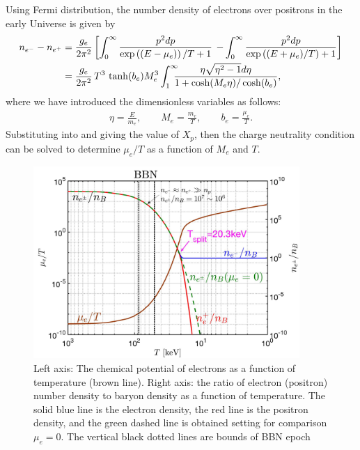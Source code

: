 Using Fermi distribution, the number density of electrons over positrons in the early Universe is given by
\begin{align}\label{ee_density}
n_{e^-}-n_{{e^+}}&=\frac{g_e}{2\pi^2}\left[\int_0^\infty\frac{p^2dp}{\exp{\left((E-\mu_e)\right)/T}+1}\right.\left.-\int_0^\infty\frac{p^2dp}{\exp{\left((E+\mu_e)/T\right)}+1}\right]\notag\\
&=\frac{g_e}{2\pi^2}\,{T^3}\,\tanh(b_e)M_e^3\int_{1}^\infty \!\!\!\!\frac{ \eta \sqrt{\eta^2-1} d\eta}{1+\cosh(M_e\eta)/\cosh(b_e)},
\end{align}
where we have introduced the dimensionless variables as follows: 
\begin{align}\label{Variables}
\eta=\frac{E}{m_e},\qquad M_e=\frac{m_e}{T},\qquad b_e=\frac{\mu_e}{T}.
\end{align}
Substituting  into  and giving the value of $X_p$, then the charge neutrality condition can be solved to determine $\mu_e/T$ as a function of $M_e$ and $T$. 

\begin{figure}
\centerline{\includegraphics[width=0.90\textwidth]{plots/chap03BBN/May152023_EPDensity_Chemical}}
\caption{Left axis: The chemical potential of electrons as a function of temperature (brown line). Right axis: the ratio of electron (positron) number density to baryon density as a function of temperature. The solid blue line is the electron density, the red  line is the positron density, and the green dashed line is obtained setting for comparison $\mu_e=0$. The vertical black dotted lines are bounds of BBN epoch}
\label{BBN:Electron}
\end{figure}

